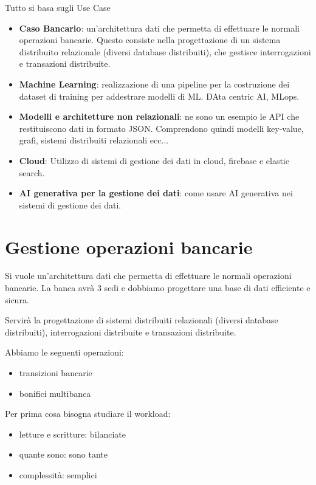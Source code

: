Tutto si basa sugli Use Case
\begin{itemize}
    \item \textbf{Caso Bancario}: un'architettura dati che permetta di effettuare
          le normali operazioni bancarie. Questo consiste nella progettazione di
          un sistema distribuito relazionale (diversi database distribuiti), che
          gestisce interrogazioni e transazioni distribuite.
    \item \textbf{Machine Learning}: realizzazione di una pipeline per la
          costruzione dei dataset di training per addestrare modelli di ML.
          DAta centric AI, MLops.
    \item \textbf{Modelli e architetture non relazionali}: ne sono un esempio
          le API che restituiscono dati in formato JSON. Comprendono quindi
          modelli key-value, grafi, sistemi distribuiti relazionali ecc...
    \item \textbf{Cloud}: Utilizzo di sistemi di gestione dei dati in cloud,
          firebase e elastic search.
    \item \textbf{AI generativa per la gestione dei dati}: come usare AI
          generativa nei sistemi di gestione dei dati.
\end{itemize}

\section{Gestione operazioni bancarie}
Si vuole un'architettura dati che permetta di effettuare le normali operazioni
bancarie. La banca avrà $3$ sedi e dobbiamo progettare una base di dati efficiente 
e sicura.

Servirà la progettazione di sistemi distribuiti relazionali (diversi
database distribuiti), interrogazioni distribuite e transazioni distribuite.

Abbiamo le seguenti operazioni:
\begin{itemize}
    \item transizioni bancarie
    \item bonifici multibanca
\end{itemize}

Per prima cosa bisogna studiare il workload:
\begin{itemize}
    \item letture e scritture: bilanciate
    \item quante sono: sono tante
    \item complessità: semplici
\end{itemize}

